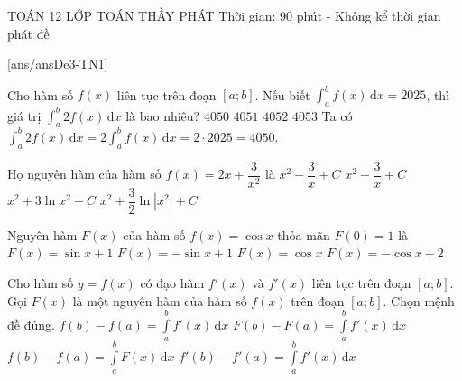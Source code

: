 \begin{name}
	{\tenchude}
	{TOÁN 12}
	{LỚP TOÁN THẦY PHÁT}
	{Thời gian: 90 phút - Không kể thời gian phát đề}
\end{name}
[ans/ansDe3-TN1]
\begin{ex}%
Cho hàm số $f(x)$ liên tục trên đoạn $[a;b]$. Nếu biết $\displaystyle\int_a^b f(x) \mathrm{\,d}x = 2025$, thì giá trị $\displaystyle\int_a^b 2f(x) \mathrm{\,d}x$ là bao nhiêu?
\choice
{\True $4050$}
{$4051$}
{$4052$}
{$4053$}
\loigiai
{ Ta có $\displaystyle\int_a^b 2f(x) \mathrm{\,d}x = 2\displaystyle\int_a^b f(x) \mathrm{\,d}x = 2 \cdot 2025 = 4050$.
}
\end{ex}

\begin{ex}%
Họ nguyên hàm của hàm số $f(x)=2x+\dfrac{3}{x^2}$ là
\choice
{\True $x^2-\dfrac{3}{x}+C$}
{$x^2+\dfrac{3}{x}+C$}
{$x^2+3\ln {x^2}+C$}
{$x^2+\dfrac{3}{2}\ln |x^2|+C$}
\end{ex}

\begin{ex}%
Nguyên hàm $F(x)$ của hàm số $f(x) = \cos x$ thỏa mãn $F(0) = 1$ là
\choice
{\True $F(x) = \sin x + 1$ }
{ $F(x) = -\sin x + 1$ }
{ $F(x) = \cos x$ }
{ $F(x) = -\cos x + 2$ }
\end{ex}

\begin{ex}%
Cho hàm số $y=f(x)$ có đạo hàm $f'(x)$ và $f'(x)$ liên tục trên đoạn $[a;b]$. Gọi $F(x)$ là một nguyên hàm của hàm số $f(x)$ trên đoạn $[a;b]$. Chọn mệnh đề đúng.
\choice
{\True $f(b)-f(a)=\displaystyle\int\limits_{a}^{b}f'(x)\mathrm{\,d}x$}
{$F(b)-F(a)=\displaystyle\int\limits_{a}^{b}f'(x)\mathrm{\,d}x$}
{$f(b)-f(a)=\displaystyle\int\limits_{a}^{b}F(x)\mathrm{\,d}x$}
{$f'(b)-f'(a)=\displaystyle\int\limits_{a}^{b}f'(x)\mathrm{\,d}x$}
\end{ex}

